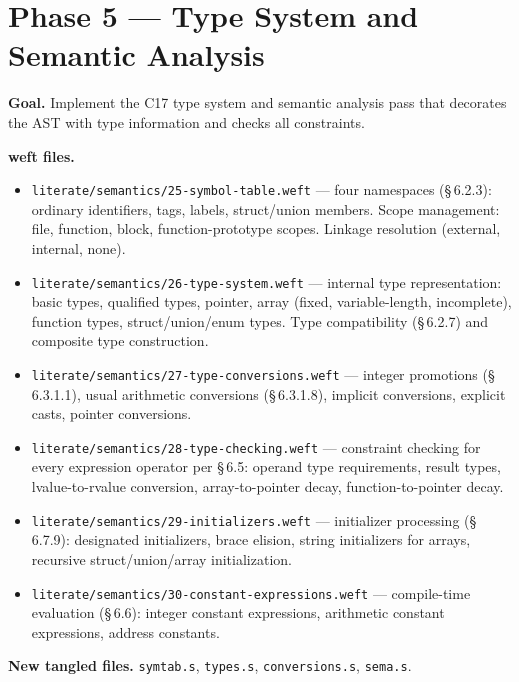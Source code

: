 \documentclass[11pt,a4paper,twoside,openright,DIV=15]{scrbook}
\theoremstyle{definition}
\theoremstyle{plain}
\theoremstyle{remark}
\newcommand{\stdref}[1]{\S\,#1}
\begin{document}
\section{Phase 5 --- Type System and Semantic Analysis}
\label{sec:phase5}

\textbf{Goal.}  Implement the C17 type system and semantic
analysis pass that decorates the AST with type information and
checks all constraints.

\textbf{weft files.}
\begin{itemize}
\item \texttt{literate/semantics/25-symbol-table.weft} ---
      four namespaces (\stdref{6.2.3}): ordinary identifiers,
      tags, labels, struct/union members.  Scope management:
      file, function, block, function-prototype scopes.
      Linkage resolution (external, internal, none).
\item \texttt{literate/semantics/26-type-system.weft} ---
      internal type representation: basic types, qualified types,
      pointer, array (fixed, variable-length, incomplete),
      function types, struct/union/enum types.
      Type compatibility (\stdref{6.2.7}) and composite type
      construction.
\item \texttt{literate/semantics/27-type-conversions.weft} ---
      integer promotions (\stdref{6.3.1.1}), usual arithmetic
      conversions (\stdref{6.3.1.8}), implicit conversions,
      explicit casts, pointer conversions.
\item \texttt{literate/semantics/28-type-checking.weft} ---
      constraint checking for every expression operator per
      \stdref{6.5}: operand type requirements, result types,
      lvalue-to-rvalue conversion, array-to-pointer decay,
      function-to-pointer decay.
\item \texttt{literate/semantics/29-initializers.weft} ---
      initializer processing (\stdref{6.7.9}): designated
      initializers, brace elision, string initializers for
      arrays, recursive struct/union/array initialization.
\item \texttt{literate/semantics/30-constant-expressions.weft} ---
      compile-time evaluation (\stdref{6.6}): integer constant
      expressions, arithmetic constant expressions, address
      constants.
\end{itemize}

\textbf{New tangled files.}
\texttt{symtab.s}, \texttt{types.s}, \texttt{conversions.s},
\texttt{sema.s}.
\end{document}
